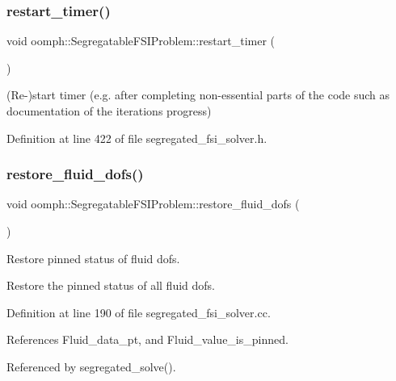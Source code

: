 \subsubsection{\texorpdfstring{restart\+\_\+timer()}{restart\_timer()}}
{\footnotesize\ttfamily void oomph\+::\+Segregatable\+F\+S\+I\+Problem\+::restart\+\_\+timer (\begin{DoxyParamCaption}{ }\end{DoxyParamCaption})\hspace{0.3cm}{\ttfamily [inline]}}



(Re-\/)start timer (e.\+g. after completing non-\/essential parts of the code such as documentation of the iteration\textquotesingle{}s progress) 



Definition at line 422 of file segregated\+\_\+fsi\+\_\+solver.\+h.

\mbox{\label{classoomph_1_1SegregatableFSIProblem_abbf4987f2891218d8efcf53de6150425}} 
\subsubsection{\texorpdfstring{restore\+\_\+fluid\+\_\+dofs()}{restore\_fluid\_dofs()}}
{\footnotesize\ttfamily void oomph\+::\+Segregatable\+F\+S\+I\+Problem\+::restore\+\_\+fluid\+\_\+dofs (\begin{DoxyParamCaption}{ }\end{DoxyParamCaption})\hspace{0.3cm}{\ttfamily [protected]}}



Restore pinned status of fluid dofs. 

Restore the pinned status of all fluid dofs. 

Definition at line 190 of file segregated\+\_\+fsi\+\_\+solver.\+cc.



References Fluid\+\_\+data\+\_\+pt, and Fluid\+\_\+value\+\_\+is\+\_\+pinned.



Referenced by segregated\+\_\+solve().

